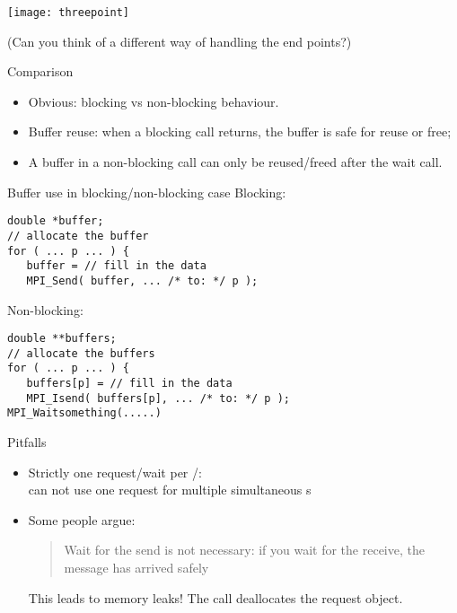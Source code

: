 \begin{exerciseframe}[isendirecv]
  
  
  \texttt{[image: threepoint]}

  (Can you think of a different way of handling the end points?)
\end{exerciseframe}

\begin{numberedframe}{Comparison}
  \begin{itemize}
  \item Obvious: blocking vs non-blocking behaviour.
  \item Buffer reuse: when a blocking call returns, the buffer
    is safe for reuse or free;
  \item A buffer in a non-blocking call can only be reused/freed
    after the wait call.
  \end{itemize}
\end{numberedframe}

\begin{numberedframe}{Buffer use in blocking/non-blocking case}
Blocking:
\lstset{language=C}
\begin{lstlisting}
double *buffer;
// allocate the buffer
for ( ... p ... ) {
   buffer = // fill in the data
   MPI_Send( buffer, ... /* to: */ p );
\end{lstlisting}
Non-blocking:
\begin{lstlisting}
double **buffers;
// allocate the buffers
for ( ... p ... ) {
   buffers[p] = // fill in the data
   MPI_Isend( buffers[p], ... /* to: */ p );
MPI_Waitsomething(.....)
\end{lstlisting}
\end{numberedframe}

\begin{numberedframe}{Pitfalls}
  \begin{itemize}
  \item Strictly one request/wait per /:\\
    can not use one request for multiple simultaneous s
  \item Some people argue:
    \begin{quote}
      Wait for the send is not necessary: if you wait for the receive, the message
      has arrived safely
    \end{quote}
    This leads to memory leaks! The  call deallocates the request object.
  \end{itemize}
\end{numberedframe}

